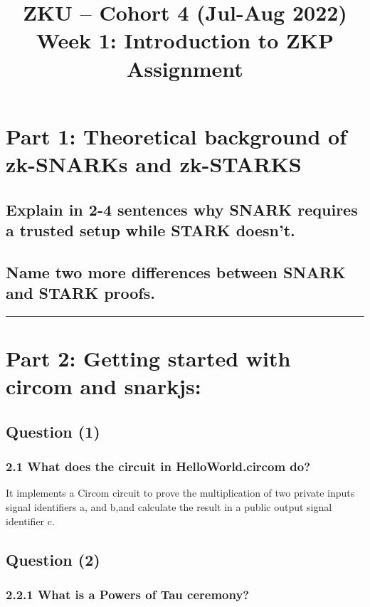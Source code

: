 \documentclass[letterpaper, 10 pt, conference]{ieeeconf}  %
\title{\LARGE \bf
ZKU – Cohort 4 (Jul-Aug 2022)\\Week 1: Introduction to ZKP\\Assignment \sharp 1}
\author{Isk#0996}
\begin{document}
\maketitle
\thispagestyle{empty}
\pagestyle{empty}


\section{\textbf{Part 1:} Theoretical background of zk-SNARKs and zk-STARKS}
\subsection{\textbf{Explain in 2-4 sentences why SNARK requires a trusted setup while STARK doesn’t.}}

\subsection{\textbf{Name two more differences between SNARK and STARK proofs.}}

\noindent\rule{8cm}{0.4pt}

\section{\textbf{Part 2:} Getting started with circom and snarkjs:}
\subsection{\textbf{Question (1)}}
\subsubsection{\textbf{2.1 What does the circuit in HelloWorld.circom do?}}

It implements a Circom circuit to prove the multiplication of two private inputs signal identifiers a, and b,and calculate the result in a public output signal identifier c. 

\subsection{\textbf{Question (2)}}
\subsubsection{\textbf{2.2.1 What is a Powers of Tau ceremony?}}
\end{document}
